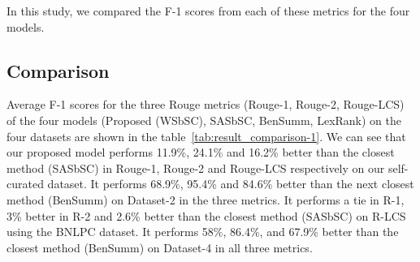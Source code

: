 In this study, we compared the F-1 scores from each of these metrics for the four models.

\subsection{Comparison}\label{subsec:comparison}
Average F-1 scores for the three Rouge metrics (Rouge-1, Rouge-2, Rouge-LCS) of the four models (Proposed (WSbSC),
SASbSC, BenSumm, LexRank) on the four datasets are shown in the table~\ref{tab:result_comparison-1}.
We can see that our proposed model performs 11.9\%, 24.1\% and 16.2\% better
than the closest method (SASbSC) in Rouge-1, Rouge-2 and Rouge-LCS respectively
on our self-curated dataset.
It performs 68.9\%, 95.4\% and 84.6\% better than the next closest method (BenSumm) on
Dataset-2 in the three metrics.
It performs a tie in R-1, 3\% better in R-2 and 2.6\% better than
the closest method (SASbSC) on R-LCS using the BNLPC dataset.
It performs 58\%, 86.4\%, and 67.9\% better than the closest
method (BenSumm) on Dataset-4 in all three metrics.\\


